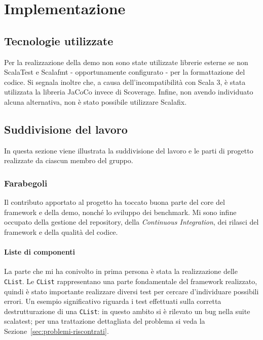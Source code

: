 \chapter{Implementazione}\label{ch:implementazione}

\section{Tecnologie utilizzate}\label{sec:tecnologie-utilizzate}
Per la realizzazione della demo non sono state utilizzate librerie esterne se non ScalaTest e
Scalafmt\cite{scalafmt} - opportunamente configurato - per la formattazione del codice.
Si segnala inoltre che, a causa dell'incompatibilità con Scala 3,  è stata utilizzata la libreria JaCoCo\cite{jacoco} invece di
Scoverage.
Infine, non avendo individuato alcuna alternativa, non è stato possibile utilizzare Scalafix.

\section{Suddivisione del lavoro}\label{sec:suddivisione-del-lavoro}
In questa sezione viene illustrata la suddivisione del lavoro e le parti di progetto realizzate da ciascun membro del
gruppo.

\subsection{Farabegoli}\label{subsec:farabegoli}
Il contributo apportato al progetto ha toccato buona parte del core del framework e della demo, nonché lo sviluppo
dei benchmark.
Mi sono infine occupato della gestione del repository, della \textit{Continuous Integration}, dei rilasci del framework
e della qualità del codice.

\subsubsection{Liste di componenti}
La parte che mi ha conivolto in prima persona è stata la realizzazione delle \texttt{CList}.
Le \texttt{CList} rappresentano una parte fondamentale del framework realizzato, quindi è stato importante realizzare
diversi test per cercare d'individuare possibili errori.
Un esempio significativo riguarda i test effettuati sulla corretta destrutturazione di una \texttt{CList}: in questo
ambito si è rilevato un bug nella suite scalatest;
per una trattazione dettagliata del problema si veda la Sezione~\ref{sec:problemi-riscontrati}.

